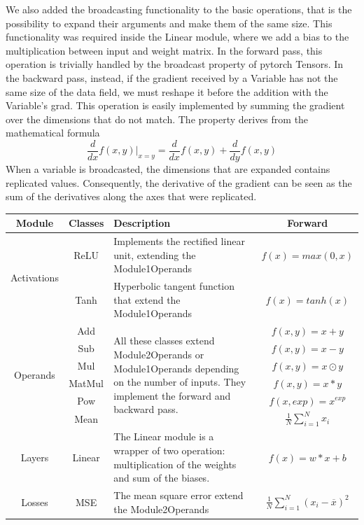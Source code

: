 \documentclass[10pt,conference,compsocconf]{IEEEtran}
\begin{document}
We also added the broadcasting functionality to the basic operations, that is the possibility to expand their arguments and make them of the same size. This functionality was required inside the Linear module, where we add a bias to the multiplication between input and weight matrix.
In the forward pass, this operation is trivially handled by the broadcast property of pytorch Tensors. In the backward pass, instead, if the gradient received by a Variable has not the same size of the data field, we must reshape it before the addition with the Variable's grad. This operation is easily implemented by summing the gradient over the dimensions that do not match. The property derives from the mathematical formula
\[\frac{d}{dx}f(x,y)|_{x=y} = \frac{d}{dx}f(x,y) + \frac{d}{dy}f(x,y)\]
When a variable is broadcasted, the dimensions that are expanded contains replicated values. Consequently, the derivative of the gradient can be seen as the sum of the derivatives along the axes that were replicated.




\begin{table}

\begin{tabular}{ | c | c | p{10cm} | c | } 
\hline
Module & Classes & Description & Forward  \\
\hline
\multirow{2}{4em}{Activations} 
& ReLU & Implements the rectified linear unit, extending the Module1Operands & $f(x) = max(0, x)$  \\
& Tanh & Hyperbolic tangent function that extend the Module1Operands & $f(x) = tanh(x)$ \\
\hline
\multirow{6}{4em}{Operands}
& Add & \multirow{6}{30em}{All these classes extend Module2Operands or Module1Operands depending on the number of inputs. They implement the forward and backward pass. } & $f(x, y) = x + y$ \\
& Sub & & $f(x, y) = x - y$ \\ 
& Mul & & $f(x, y) = x \odot y$ \\ 
& MatMul & & $f(x, y) = x * y$ \\ 
& Pow & & $f(x, exp) = x^{exp}$ \\ 
& Mean & & $\frac{1}{N} \sum_{i=1}^N x_i$ \\
\hline
Layers & Linear & The Linear module is a wrapper of two operation: multiplication of the weights and sum of the biases. & $f(x) = w*x + b$ \\ 
\hline
Losses & MSE & The mean square error extend the Module2Operands & $\frac{1}{N} \sum_{i=1}^N (x_i - \overline{x})^2$  \\ 
\hline
\end{tabular}
\end{table}
\end{document}
